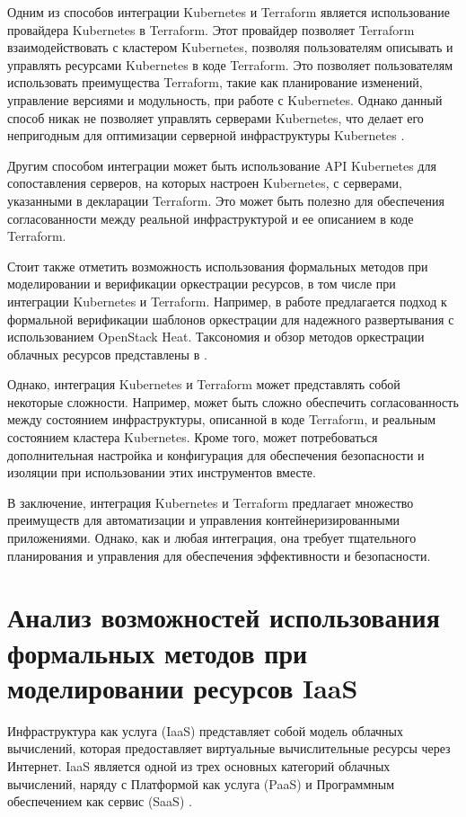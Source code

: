 Одним из способов интеграции Kubernetes и Terraform является использование
провайдера Kubernetes в Terraform. Этот провайдер позволяет Terraform
взаимодействовать с кластером Kubernetes, позволяя пользователям описывать
и управлять ресурсами Kubernetes в коде Terraform. Это позволяет
пользователям использовать преимущества Terraform, такие как планирование
изменений, управление версиями и модульность, при работе с Kubernetes.
Однако данный способ никак не позволяет управлять серверами
Kubernetes, что делает его непригодным для оптимизации серверной
инфраструктуры Kubernetes \cite{davis2021bootstrapping}.

Другим способом интеграции может быть использование API Kubernetes
для сопоставления серверов, на которых настроен Kubernetes, с серверами,
указанными в декларации Terraform. Это может быть полезно для обеспечения
согласованности между реальной инфраструктурой и ее описанием в коде
Terraform.

Стоит также отметить возможность использования формальных методов при
моделировании
и верификации оркестрации ресурсов, в том числе при интеграции Kubernetes и
Terraform.
Например, в работе \cite{sylla2019formal} предлагается подход к формальной
верификации шаблонов
оркестрации для надежного развертывания с использованием OpenStack Heat. 
Таксономия и обзор методов оркестрации облачных ресурсов представлены в
\cite{weerasiri2017taxonomy}.

Однако, интеграция Kubernetes и Terraform может представлять собой
некоторые сложности. Например, может быть сложно обеспечить согласованность
между состоянием инфраструктуры, описанной в коде Terraform,
и реальным состоянием кластера Kubernetes. Кроме того, может
потребоваться дополнительная настройка и конфигурация для обеспечения
безопасности и изоляции при использовании этих инструментов вместе.

В заключение, интеграция Kubernetes и Terraform предлагает множество
преимуществ для автоматизации и управления контейнеризированными
приложениями. Однако, как и любая интеграция, она требует тщательного
планирования и управления для обеспечения эффективности и безопасности.

\section{Анализ возможностей использования формальных методов при
моделировании ресурсов IaaS}
Инфраструктура как услуга (IaaS) представляет собой модель облачных
вычислений, которая предоставляет виртуальные вычислительные ресурсы
через Интернет. IaaS является одной из трех основных категорий облачных
вычислений, наряду с Платформой как услуга (PaaS) и Программным обеспечением
как сервис (SaaS) \cite{iaas2017}.

